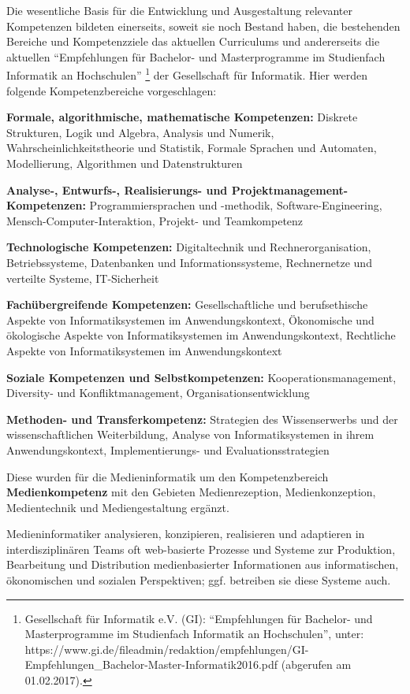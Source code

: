 Die wesentliche Basis für die Entwicklung und Ausgestaltung relevanter
Kompetenzen bildeten einerseits, soweit sie noch Bestand haben, die
bestehenden Bereiche und Kompetenzziele das aktuellen Curriculums und
andererseits die aktuellen ``Empfehlungen für Bachelor- und
Masterprogramme im Studienfach Informatik an Hochschulen'' \footnote{Gesellschaft
  für Informatik e.V. (GI): ``Empfehlungen für Bachelor- und
  Masterprogramme im Studienfach Informatik an Hochschulen'', unter:
  https://www.gi.de/fileadmin/redaktion/empfehlungen/GI-Empfehlungen\_Bachelor-Master-Informatik2016.pdf
  (abgerufen am 01.02.2017).} der Gesellschaft für Informatik. Hier
werden folgende Kompetenzbereiche vorgeschlagen:

\textbf{Formale, algorithmische, mathematische Kompetenzen:} Diskrete
Strukturen, Logik und Algebra, Analysis und Numerik,
Wahrscheinlichkeitstheorie und Statistik, Formale Sprachen und
Automaten, Modellierung, Algorithmen und Datenstrukturen

\textbf{Analyse-, Entwurfs-, Realisierungs- und
Projektmanagement-Kompetenzen:} Programmiersprachen und -methodik,
Software-Engineering, Mensch-Computer-Interaktion, Projekt- und
Teamkompetenz

\textbf{Technologische Kompetenzen:} Digitaltechnik und
Rechnerorganisation, Betriebssysteme, Datenbanken und
Informationssysteme, Rechnernetze und verteilte Systeme, IT-Sicherheit

\textbf{Fachübergreifende Kompetenzen:} Gesellschaftliche und
berufsethische Aspekte von Informatiksystemen im Anwendungskontext,
Ökonomische und ökologische Aspekte von Informatiksystemen im
Anwendungskontext, Rechtliche Aspekte von Informatiksystemen im
Anwendungskontext

\textbf{Soziale Kompetenzen und Selbstkompetenzen:}
Kooperationsmanagement, Diversity- und Konfliktmanagement,
Organisationsentwicklung

\textbf{Methoden- und Transferkompetenz:} Strategien des Wissenserwerbs
und der wissenschaftlichen Weiterbildung, Analyse von Informatiksystemen
in ihrem Anwendungskontext, Implementierungs- und Evaluationsstrategien

Diese wurden für die Medieninformatik um den Kompetenzbereich
\textbf{Medienkompetenz} mit den Gebieten Medienrezeption,
Medienkonzeption, Medientechnik und Mediengestaltung ergänzt.

Medieninformatiker analysieren, konzipieren, realisieren und adaptieren
in interdisziplinären Teams oft web-basierte Prozesse und Systeme zur
Produktion, Bearbeitung und Distribution medienbasierter Informationen
aus informatischen, ökonomischen und sozialen Perspektiven; ggf.
betreiben sie diese Systeme auch.


